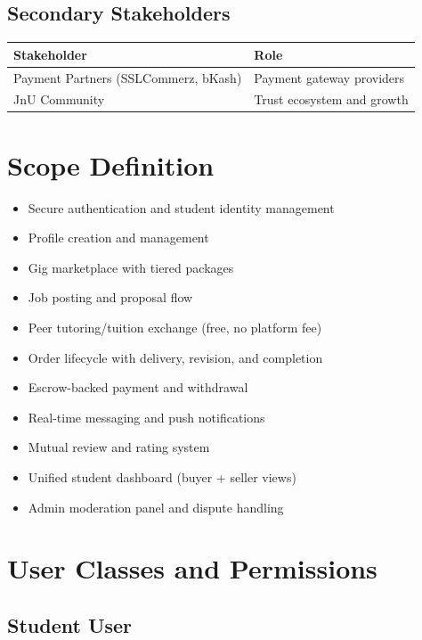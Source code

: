 \documentclass[a4paper,12pt]{article}
\begin{document}
\subsection{Secondary Stakeholders}

\begin{table}[H]
\centering
\begin{tabular}{|l|l|}
\hline
\textbf{Stakeholder} & \textbf{Role} \\
\hline
Payment Partners (SSLCommerz, bKash) & Payment gateway providers \\
JnU Community & Trust ecosystem and growth \\
\hline
\end{tabular}
\end{table}

\section{Scope Definition}

\begin{itemize}
    \item Secure authentication and student identity management
    \item Profile creation and management
    \item Gig marketplace with tiered packages
    \item Job posting and proposal flow
    \item Peer tutoring/tuition exchange (free, no platform fee)
    \item Order lifecycle with delivery, revision, and completion
    \item Escrow-backed payment and withdrawal
    \item Real-time messaging and push notifications
    \item Mutual review and rating system
    \item Unified student dashboard (buyer + seller views)
    \item Admin moderation panel and dispute handling
\end{itemize}

\section{User Classes and Permissions}

\subsection{Student User}
\end{document}
